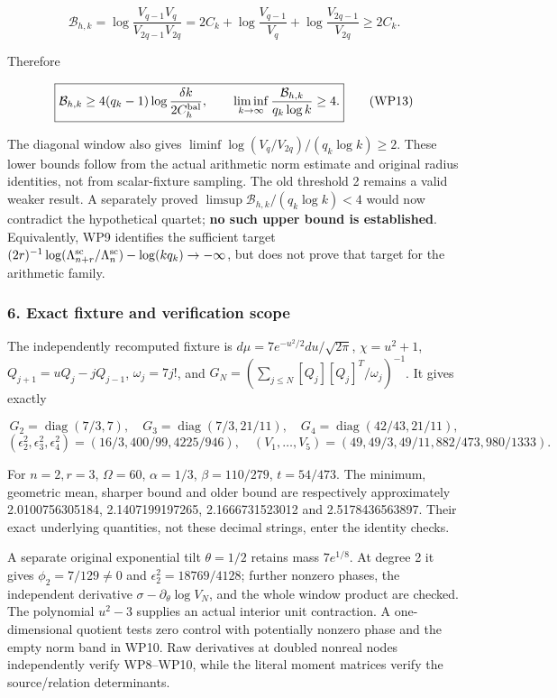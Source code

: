 \[
\mathcal B_{h,k}=\log\frac{V_{q-1}V_q}{V_{2q-1}V_{2q}}
=2C_k+\log\frac{V_{q-1}}{V_q}+\log\frac{V_{2q-1}}{V_{2q}}\ge2C_k.
\]

Therefore

\[
\boxed{\mathcal B_{h,k}\ge4(q_k-1)\log\frac{\delta k}{2C_h^{\rm bal}},
\qquad \liminf_{k\to\infty}\frac{\mathcal B_{h,k}}{q_k\log k}\ge4.} \tag{WP13}
\]

The diagonal window also gives \(\liminf\log(V_q/V_{2q})/(q_k\log k)\ge2\). These lower bounds follow from the actual arithmetic norm estimate and original radius identities, not from scalar-fixture sampling. The old threshold 2 remains a valid weaker result. A separately proved \(\limsup\mathcal B_{h,k}/(q_k\log k)<4\) would now contradict the hypothetical quartet; \textbf{no such upper bound is established}. Equivalently, WP9 identifies the sufficient target \((2r)^{-1}\log(\Lambda_{n+r}^{\rm sc}/\Lambda_n^{\rm sc})-\log(kq_k)\to-\infty\), but does not prove that target for the arithmetic family.

\subsubsection{6. Exact fixture and verification scope}\label{endpoint-window_product_owner--exact-fixture-and-verification-scope}

The independently recomputed fixture is \(d\mu=7e^{-u^2/2}du/\sqrt{2\pi}\), \(\chi=u^2+1\), \(Q_{j+1}=uQ_j-jQ_{j-1}\), \(\omega_j=7j!\), and \(G_N=(\sum_{j\le N}[Q_j][Q_j]^T/\omega_j)^{-1}\). It gives exactly

\[
G_2=\operatorname{diag}(7/3,7),\quad G_3=\operatorname{diag}(7/3,21/11),\quad
G_4=\operatorname{diag}(42/43,21/11),
\] \[
(\epsilon_2^2,\epsilon_3^2,\epsilon_4^2)=(16/3,400/99,4225/946),
\quad(V_1,\ldots,V_5)=(49,49/3,49/11,882/473,980/1333).
\]

For \(n=2,r=3\), \(\Omega=60\), \(\alpha=1/3\), \(\beta=110/279\), \(t=54/473\). The minimum, geometric mean, sharper bound and older bound are respectively approximately 2.0100756305184, 2.1407199197265, 2.1666731523012 and 2.5178436563897. Their exact underlying quantities, not these decimal strings, enter the identity checks.

A separate original exponential tilt \(\theta=1/2\) retains mass \(7e^{1/8}\). At degree 2 it gives \(\phi_2=7/129\ne0\) and \(\epsilon_2^2=18769/4128\); further nonzero phases, the independent derivative \(\sigma-\partial_\theta\log V_N\), and the whole window product are checked. The polynomial \(u^2-3\) supplies an actual interior unit contraction. A one-dimensional quotient tests zero control with potentially nonzero phase and the empty norm band in WP10. Raw derivatives at doubled nonreal nodes independently verify WP8--WP10, while the literal moment matrices verify the source/relation determinants.

